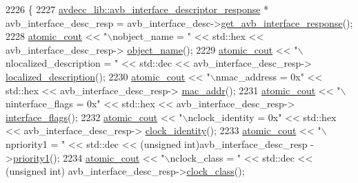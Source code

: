 \begin{DoxyCode}
2226         \{
2227             \hyperlink{classavdecc__lib_1_1avb__interface__descriptor__response}{avdecc\_lib::avb\_interface\_descriptor\_response} * 
      avb\_interface\_desc\_resp = avb\_interface\_desc->\hyperlink{classavdecc__lib_1_1avb__interface__descriptor_a1390fe74fc65f7cabb73c64ba1770318}{get\_avb\_interface\_response}();
2228             \hyperlink{cmd__line_8h_a0bc38ccc65c79ba06c6fcd7b4bf554c3}{atomic\_cout} << \textcolor{stringliteral}{"\(\backslash\)nobject\_name = "} << std::hex << avb\_interface\_desc\_resp->
      \hyperlink{classavdecc__lib_1_1descriptor__response__base_a133f7774946d80f82b8aaaa4cfbb7361}{object\_name}();
2229             \hyperlink{cmd__line_8h_a0bc38ccc65c79ba06c6fcd7b4bf554c3}{atomic\_cout} << \textcolor{stringliteral}{"\(\backslash\)nlocalized\_description = "} << std::dec << avb\_interface\_desc\_resp->
      \hyperlink{classavdecc__lib_1_1avb__interface__descriptor__response_a1fb9de45567df344090a1407aa6b775f}{localized\_description}();
2230             \hyperlink{cmd__line_8h_a0bc38ccc65c79ba06c6fcd7b4bf554c3}{atomic\_cout} << \textcolor{stringliteral}{"\(\backslash\)nmac\_address = 0x"} << std::hex << avb\_interface\_desc\_resp->
      \hyperlink{classavdecc__lib_1_1avb__interface__descriptor__response_aeefc128adde1e419ae731c1a05791053}{mac\_addr}();
2231             \hyperlink{cmd__line_8h_a0bc38ccc65c79ba06c6fcd7b4bf554c3}{atomic\_cout} << \textcolor{stringliteral}{"\(\backslash\)ninterface\_flags = 0x"} << std::hex << avb\_interface\_desc\_resp->
      \hyperlink{classavdecc__lib_1_1avb__interface__descriptor__response_ab7fe1dff73b89a46f6eaced839a16753}{interface\_flags}();
2232             \hyperlink{cmd__line_8h_a0bc38ccc65c79ba06c6fcd7b4bf554c3}{atomic\_cout} << \textcolor{stringliteral}{"\(\backslash\)nclock\_identity = 0x"} << std::hex << avb\_interface\_desc\_resp->
      \hyperlink{classavdecc__lib_1_1avb__interface__descriptor__response_a25301d8ad0be863448197df63d847666}{clock\_identity}();
2233             \hyperlink{cmd__line_8h_a0bc38ccc65c79ba06c6fcd7b4bf554c3}{atomic\_cout} << \textcolor{stringliteral}{"\(\backslash\)npriority1 = "} << std::dec << (\textcolor{keywordtype}{unsigned} int)avb\_interface\_desc\_resp
      ->\hyperlink{classavdecc__lib_1_1avb__interface__descriptor__response_a9c883a3dd7880a9556aa7d78c03d5506}{priority1}();
2234             \hyperlink{cmd__line_8h_a0bc38ccc65c79ba06c6fcd7b4bf554c3}{atomic\_cout} << \textcolor{stringliteral}{"\(\backslash\)nclock\_class = "} << std::dec << (\textcolor{keywordtype}{unsigned} int)
      avb\_interface\_desc\_resp->\hyperlink{classavdecc__lib_1_1avb__interface__descriptor__response_aa6030a1199f813b420f204facd3035d9}{clock\_class}();

\end{DoxyCode}
